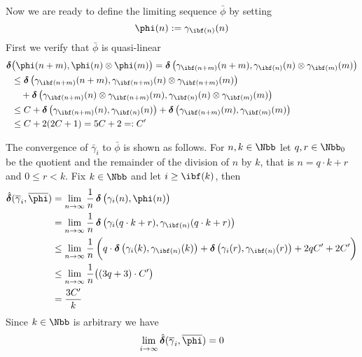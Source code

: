 \begin{Proof}
  Now we are ready to define the limiting sequence $\bar\phi$ by
  setting
  \[
  \phi(n):=\gamma_{\ibf(n)}(n)
  \]
  First we verify that $\bar\phi$ is quasi-linear
  \begin{align*}
    \dist
    &\big(
      \phi(n+m),
      \phi(n)\otimes\phi(m)
    \big)
    =
    \dist
    \big(
      \gamma_{\ibf(n+m)}(n+m),
      \gamma_{\ibf(n)}(n)\otimes\gamma_{\ibf(m)}(m)
    \big)
    \\
    &\leq
    \dist
    \big(
      \gamma_{\ibf(n+m)}(n+m),
      \gamma_{\ibf(n+m)}(n)\otimes\gamma_{\ibf(n+m)}(m)
    \big)
    \\
    &\quad+
    \dist
    \big(
      \gamma_{\ibf(n+m)}(n)\otimes\gamma_{\ibf(n+m)}(m),
      \gamma_{\ibf(n)}(n)\otimes\gamma_{\ibf(m)}(m)
    \big)
    \\
    &\leq  
    C+
    \dist
    \big(
      \gamma_{\ibf(n+m)}(n),
      \gamma_{\ibf(n)}(n)
    \big)
    +
    \dist
    \big(
      \gamma_{\ibf(n+m)}(m),
      \gamma_{\ibf(m)}(m)
    \big)
    \\
    &\leq
    C+2(2C+1)=5C+2=:C'
  \end{align*}
  
  The convergence of $\bar\gamma_{i}$ to $\bar\phi$ is shown as
  follows. For $n,k\in\Nbb$ let $q,r\in\Nbb_{0}$ be the quotient and
  the remainder of the division of $n$ by $k$, that is $n=q\cdot k+r$
  and $0\leq r<k$.  Fix $k\in\Nbb$ and let $i\geq\ibf(k)$, then
  \begin{align*}
    \dista(\bar\gamma_{i},\bar\phi)
    &=
    \lim_{n\to\infty}\frac1n\dist\big(\gamma_{i}(n),\phi(n)\big)\\
    &=
    \lim_{n\to\infty}
    \frac1n
    \dist\big(\gamma_{i}(q\cdot k+r),\gamma_{\ibf(n)}(q\cdot k+r)\big)\\
    &\leq
    \lim_{n\to\infty}
    \frac1n
    \left(\rule{0mm}{5mm}
    q\cdot\dist\big(\gamma_{i}(k),\gamma_{\ibf(n)}(k)\big)+
    \dist\big(\gamma_{i}(r),\gamma_{\ibf(n)}(r)\big) +
    2qC' + 2C'
    \right)\\
    &\leq
    \lim_{n\to\infty}
    \frac1n
    \big((3q+3)\cdot C'\big)\\
    &=
    \frac{3C'}{k}      
  \end{align*}
  Since $k\in\Nbb$ is arbitrary we have 
  \[
  \lim_{i\to\infty}\dista(\bar\gamma_{i},\bar\phi)=0
  \]
\end{Proof}




